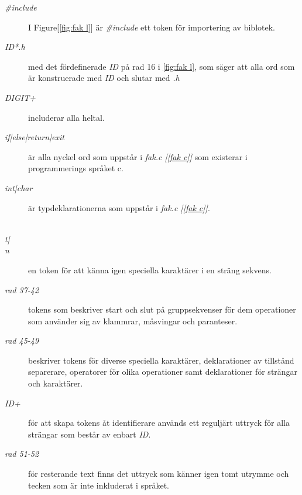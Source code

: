 \begin{description}

\item[\textit{\#include}] I Figure[\ref{fig:fak l}] är \textit{\#include} ett token för importering av biblotek. 

\item[\textit{{ID}*.h}] med det fördefinerade \textit{ID} på rad 16 i
\ref{fig:fak l}, som säger att alla ord som är konstruerade med \textit{ID} och slutar
med \textit{.h}

\item[\textit{{DIGIT}+}] includerar alla heltal.

\item[\textit{if|else|return|exit}] är alla nyckel ord som uppstår i \textit{fak.c [\ref{fak c}] }
som existerar i programmerings språket c.

\item[\textit{int|char}] är typdeklarationerna som uppstår i \textit{fak.c [\ref{fak c}]}. 

\item[\textit{\\t|\\n}] en token för att känna igen speciella karaktärer i en sträng sekvens.

\item[\textit{rad 37-42}] tokens som beskriver start och slut på gruppsekvenser för dem
operationer som använder sig av klammrar, måsvingar och paranteser.

\item[\textit{rad 45-49}] beskriver tokens för diverse speciella karaktärer, deklarationer av
tillstånd separerare, operatorer för olika operationer samt deklarationer för strängar och
karaktärer.

\item[\textit{{ID}+}] för att skapa tokens åt identifierare används ett reguljärt uttryck för alla strängar som
består av enbart \textit{ID}.

\item[\textit{rad 51-52}] för resterande text finns det uttryck som känner igen tomt utrymme och
tecken som är inte inkluderat i språket.


\end{description}
